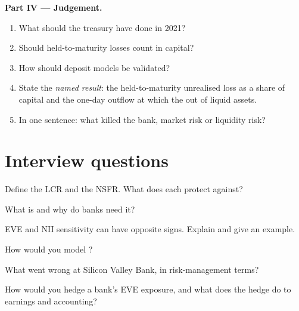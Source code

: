 \begin{problem}
\medskip\noindent\textbf{Part IV --- Judgement.}
\begin{enumerate}[resume]
\item What should the treasury have done in 2021?
\item Should held-to-maturity losses count in capital?
\item How should deposit models be validated?
\item State the \emph{named result}: the held-to-maturity unrealised loss as a share of capital and
the one-day outflow at which the  out of liquid assets.
\item In one sentence: what killed the bank, market risk or liquidity risk?
\end{enumerate}
\end{problem}

\section{Interview questions}

\begin{interviewq}\label{iq:rc:liquidity-and-funding-risk-bank-treasury:1}
Define the LCR and the NSFR. What does each protect against?
\end{interviewq}

\begin{interviewq}\label{iq:rc:liquidity-and-funding-risk-bank-treasury:2}
What is  and why do banks need it?
\end{interviewq}

\begin{interviewq}\label{iq:rc:liquidity-and-funding-risk-bank-treasury:3}
EVE and NII sensitivity can have opposite signs. Explain and give an example.
\end{interviewq}

\begin{interviewq}\label{iq:rc:liquidity-and-funding-risk-bank-treasury:4}
How would you model ?
\end{interviewq}

\begin{interviewq}\label{iq:rc:liquidity-and-funding-risk-bank-treasury:5}
What went wrong at Silicon Valley Bank, in risk-management terms?
\end{interviewq}

\begin{interviewq}\label{iq:rc:liquidity-and-funding-risk-bank-treasury:6}
How would you hedge a bank's EVE exposure, and what does the hedge do to earnings and accounting?
\end{interviewq}
